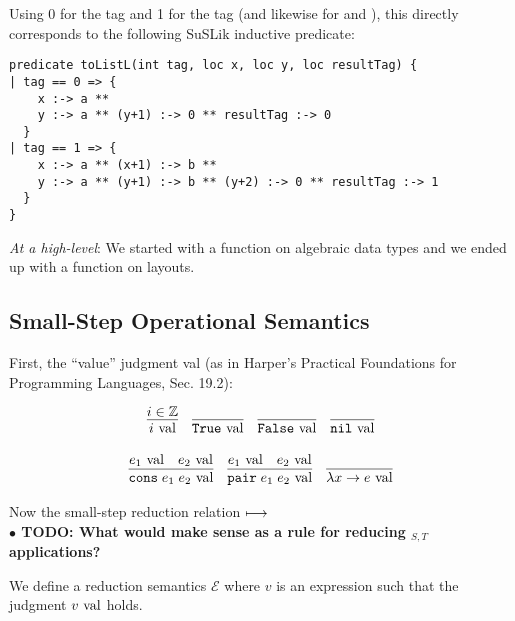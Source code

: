 \documentclass[10pt]{article}
\begin{document}
Using 0 for the  tag and 1 for the  tag (and likewise for  and ), this directly corresponds to the following SuSLik
inductive predicate:

\begin{lstlisting}
predicate toListL(int tag, loc x, loc y, loc resultTag) {
| tag == 0 => {
    x :-> a **
    y :-> a ** (y+1) :-> 0 ** resultTag :-> 0
  }
| tag == 1 => {
    x :-> a ** (x+1) :-> b **
    y :-> a ** (y+1) :-> b ** (y+2) :-> 0 ** resultTag :-> 1
  }
}
\end{lstlisting}

\noindent
\textit{At a high-level}: We started with a function on algebraic data types and we ended up with a function
on layouts.

\subsection{Small-Step Operational Semantics}

First, the ``value'' judgment val (as in Harper's Practical Foundations for Programming Languages, Sec. 19.2):

\[
  \begin{array}{cc}
    \infer{i \val}{i \in \mathbb{Z}}
    ~~~
    \infer{\True \val}{}
    ~~~
    \infer{\False \val}{}
    ~~~
    \infer{\nil \val}{}
    \\\\
    \infer{\cons\; e_1\; e_2 \val}{e_1 \val & e_2 \val}
    ~~~
    \infer{\pair\; e_1\; e_2 \val}{e_1 \val & e_2 \val}
    ~~~
    \infer{\lambda x \ra e \val}{}
  \end{array}
\]

\noindent
Now the small-step reduction relation $\longmapsto$\\

\textbf{$\bullet$ TODO: What would make sense as a rule for reducing $_{S,T}$ applications?}

We define a reduction semantics $\mathcal{E}$ where $v$ is an expression such that the judgment $v \textnormal{ val}$ holds.
\end{document}
